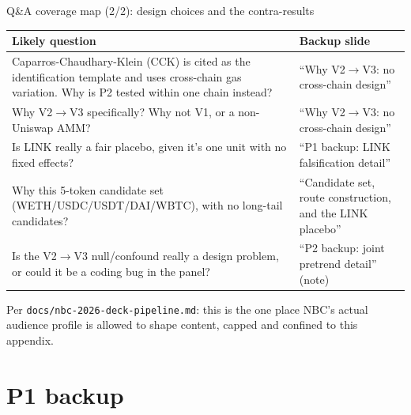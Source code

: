 \documentclass[aspectratio=169]{beamer}
\begin{document}
\begin{frame}{Q\&A coverage map (2/2): design choices and the contra-results}
  \footnotesize
  \begin{center}
  \begin{tabular}{@{}>{\raggedright\arraybackslash}p{5.6cm}>{\raggedright\arraybackslash}p{5.9cm}@{}}
    \toprule
    Likely question & Backup slide \\
    \midrule
    Caparros-Chaudhary-Klein (CCK) is cited as the identification template and uses cross-chain gas variation. Why is P2 tested within one chain instead? & ``Why V2$\to$V3: no cross-chain design'' \\[0.3em]
    Why V2$\to$V3 specifically? Why not V1, or a non-Uniswap AMM? & ``Why V2$\to$V3: no cross-chain design'' \\[0.3em]
    Is LINK really a fair placebo, given it's one unit with no fixed effects? & ``P1 backup: LINK falsification detail'' \\[0.3em]
    Why this 5-token candidate set (WETH/USDC/USDT/DAI/WBTC), with no long-tail candidates? & ``Candidate set, route construction, and the LINK placebo'' \\[0.3em]
    Is the V2$\to$V3 null/confound really a design problem, or could it be a coding bug in the panel? & ``P2 backup: joint pretrend detail'' (note) \\
    \bottomrule
  \end{tabular}
  \end{center}
  {\scriptsize Per \texttt{docs/nbc-2026-deck-pipeline.md}: this is the one place NBC's actual audience profile is allowed to shape content, capped and confined to this appendix.}
\end{frame}

\section{P1 backup}
\end{document}
